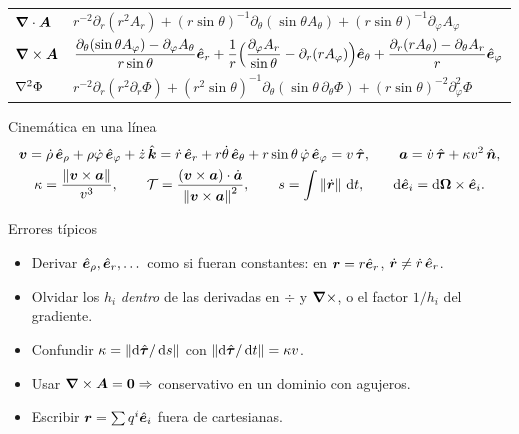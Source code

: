 \begin{table}[ht]
\begin{tabular}{@{}l l@{}}
$\bm{\nabla}\cdot\bm{A}$ & $r^{-2}\partial_{r}(r^{2}A_{r})+(r\sin\theta)^{-1}\partial_{\theta}(\sin\theta A_{\theta})+(r\sin\theta)^{-1}\partial_{\varphi}A_{\varphi}$\\
$\bm{\nabla}\times\bm{A}$ & $\dfrac{\partial_{\theta}(\sin\theta A_{\varphi})-\partial_{\varphi}A_{\theta}}{r\sin\theta}\hat{\bm{e}}_{r}
  +\dfrac{1}{r}\Bigl(\dfrac{\partial_{\varphi}A_{r}}{\sin\theta}-\partial_{r}(rA_{\varphi})\Bigr)\hat{\bm{e}}_{\theta}
  +\dfrac{\partial_{r}(rA_{\theta})-\partial_{\theta}A_{r}}{r}\hat{\bm{e}}_{\varphi}$\\
$\nabla^{2}\Phi$ & $r^{-2}\partial_{r}(r^{2}\partial_{r}\Phi)+(r^{2}\sin\theta)^{-1}\partial_{\theta}(\sin\theta\,\partial_{\theta}\Phi)+(r\sin\theta)^{-2}\partial^{2}_{\varphi}\Phi$\\
\bottomrule
\end{tabular}
\end{table}

\begin{clave}{Cinemática en una línea}
\vspace{-1.5ex}
\begin{gather*}
  \bm{v}=\dot\rho\,\hat{\bm{e}}_{\rho}+\rho\dot\varphi\,\hat{\bm{e}}_{\varphi}+\dot z\,\hat{\bm{k}}
  =\dot r\,\hat{\bm{e}}_{r}+r\dot\theta\,\hat{\bm{e}}_{\theta}+r\sin\theta\,\dot\varphi\,\hat{\bm{e}}_{\varphi}
  =v\,\hat{\bm{\tau}},\qquad
  \bm{a}=\dot v\,\hat{\bm{\tau}}+\kappa v^{2}\,\hat{\bm{n}},\\
  \kappa=\frac{\left\lVert \bm{v}\times\bm{a}\right\rVert}{v^{3}},\qquad
  \mathcal{T}=\frac{(\bm{v}\times\bm{a})\cdot\dot{\bm{a}}}{\left\lVert \bm{v}\times\bm{a}\right\rVert^{2}},\qquad
  s=\int\left\lVert \dot{\bm{r}}\right\rVert\,\mathop{}\!\mathrm{d} t,\qquad
  \mathop{}\!\mathrm{d}\hat{\bm{e}}_{i}=\mathop{}\!\mathrm{d}\bm{\Omega}\times\hat{\bm{e}}_{i}.
\end{gather*}
\end{clave}

\begin{clave}[violeta]{Errores típicos}
\begin{itemize}[leftmargin=1.3em]
  \item Derivar $\hat{\bm{e}}_{\rho},\hat{\bm{e}}_{r},\dots$ como si fueran constantes: en $\bm{r}=r\hat{\bm{e}}_{r}$,
        $\dot{\bm{r}}\neq\dot r\,\hat{\bm{e}}_{r}$.
  \item Olvidar los $h_{i}$ \emph{dentro} de las derivadas en $\div$ y $\bm{\nabla}\times$,
        o el factor $1/h_{i}$ del gradiente.
  \item Confundir $\kappa=\left\lVert \mathop{}\!\mathrm{d}\hat{\bm{\tau}}/\mathop{}\!\mathrm{d} s\right\rVert$ con $\left\lVert \mathop{}\!\mathrm{d}\hat{\bm{\tau}}/\mathop{}\!\mathrm{d} t\right\rVert=\kappa v$.
  \item Usar $\bm{\nabla}\times\bm{A}=\bm{0}\Rightarrow$ conservativo en un dominio con agujeros.
  \item Escribir $\bm{r}=\sum q^{i}\hat{\bm{e}}_{i}$ fuera de cartesianas.
\end{itemize}
\end{clave}
